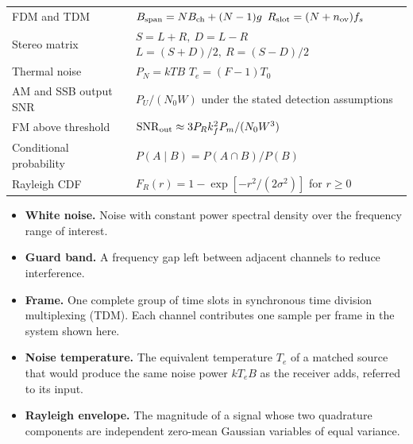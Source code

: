 \documentclass[12pt,a4paper]{article}
\renewcommand{\arraystretch}{1.45}
\begin{document}
\begin{tcolorbox}[formulabox, title={Key Formulas at a Glance}]
\renewcommand{\arraystretch}{1.35}
\noindent\begin{tabularx}{\linewidth}{B{4.4cm} Y}
FDM and TDM & $B_{\rm span}=NB_{\rm ch}+(N-1)g$ \newline $R_{\rm slot}=(N+n_{\rm ov})f_s$ \\[4pt]
Stereo matrix & $S=L+R,\ D=L-R$ \newline $L=(S+D)/2,\ R=(S-D)/2$ \\[4pt]
Thermal noise & $P_N=kTB$ \quad $T_e=(F-1)T_0$ \\[4pt]
AM and SSB output SNR & $P_U/(N_0W)$ under the stated detection assumptions \\[4pt]
FM above threshold & $\mathrm{SNR}_{\rm out}\approx3P_R k_f^2P_m/(N_0 W^3)$ \\[4pt]
Conditional probability & $P(A\mid B)=P(A\cap B)/P(B)$ \\[4pt]
Rayleigh CDF & $F_R(r)=1-\exp[-r^2/(2\sigma^2)]$ for $r\ge0$ \\[4pt]
\end{tabularx}\par
\end{tcolorbox}

\begin{tcolorbox}[defbox, title={One-Line Definitions}, title after break={One-Line Definitions (contd.)}]
\begin{itemize}[leftmargin=*, itemsep=3pt, topsep=0pt]
  \item \textbf{White noise.} Noise with constant power spectral density over the frequency range of interest.
  \item \textbf{Guard band.} A frequency gap left between adjacent channels to reduce interference.
  \item \textbf{Frame.} One complete group of time slots in synchronous time division multiplexing (TDM). Each channel contributes one sample per frame in the system shown here.
  \item \textbf{Noise temperature.} The equivalent temperature $T_e$ of a matched source that would produce the same noise power $kT_e B$ as the receiver adds, referred to its input.
  \item \textbf{Rayleigh envelope.} The magnitude of a signal whose two quadrature components are independent zero-mean Gaussian variables of equal variance.
\end{itemize}
\end{tcolorbox}
\end{document}

